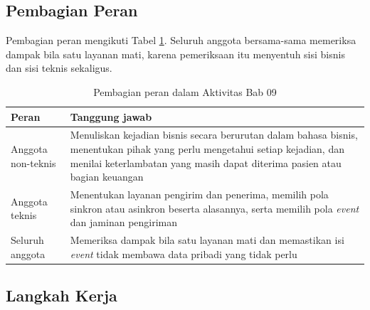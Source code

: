 \subsection*{Pembagian Peran}

Pembagian peran mengikuti Tabel \ref{tab:ch09-peran-aktivitas}. Seluruh anggota bersama-sama
memeriksa dampak bila satu layanan mati, karena pemeriksaan itu menyentuh sisi bisnis dan sisi
teknis sekaligus.

\begin{table}[!htb]
  \centering
  \caption{Pembagian peran dalam Aktivitas Bab 09}
  \label{tab:ch09-peran-aktivitas}
  \footnotesize
  \begin{tabularx}{\textwidth}{>{\raggedright\arraybackslash}p{3.0cm} >{\raggedright\arraybackslash}X}
    \hline
    \textbf{Peran} & \textbf{Tanggung jawab} \\ \hline
    Anggota non-teknis & Menuliskan kejadian bisnis secara berurutan dalam bahasa bisnis, menentukan
      pihak yang perlu mengetahui setiap kejadian, dan menilai keterlambatan yang masih dapat
      diterima pasien atau bagian keuangan \\ \hline
    Anggota teknis & Menentukan layanan pengirim dan penerima, memilih pola sinkron atau asinkron
      beserta alasannya, serta memilih pola \textit{event} dan jaminan pengiriman \\ \hline
    Seluruh anggota & Memeriksa dampak bila satu layanan mati dan memastikan isi \textit{event}
      tidak membawa data pribadi yang tidak perlu \\ \hline
  \end{tabularx}
\end{table}

\subsection*{Langkah Kerja}

